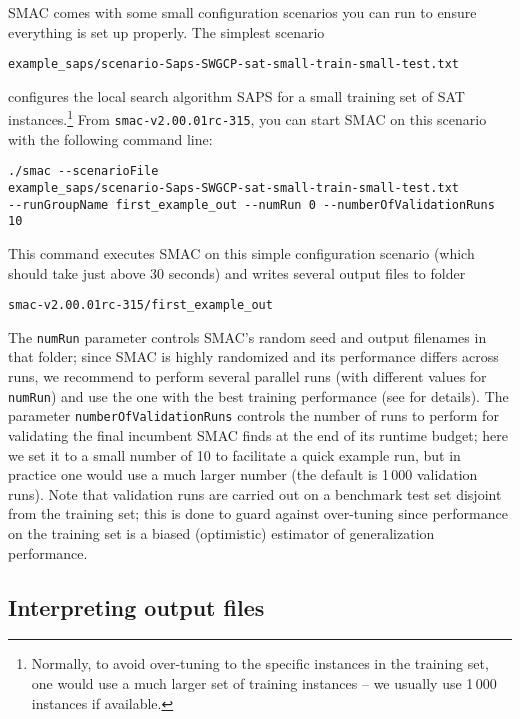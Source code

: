 \documentclass[11pt,letterpaper,twoside]{article}
\begin{document}
SMAC comes with some small configuration scenarios you can run to ensure everything is set up properly.
The simplest scenario
{\small
\begin{verbatim}
example_saps/scenario-Saps-SWGCP-sat-small-train-small-test.txt
\end{verbatim}
}
configures the local search algorithm SAPS for a small training set of SAT instances.\footnote{Normally, to avoid over-tuning to the specific instances in the training set, one would use a much larger set of training instances -- we usually use 1\,000 instances if available.} From \texttt{smac-v2.00.01rc-315}, you can start SMAC on this scenario with the following command line:
{\small
\begin{verbatim}
./smac --scenarioFile 
example_saps/scenario-Saps-SWGCP-sat-small-train-small-test.txt
--runGroupName first_example_out --numRun 0 --numberOfValidationRuns 10
\end{verbatim}
}
This command executes SMAC on this simple configuration scenario (which should take just above 30 seconds) and writes several output files to folder
{\small
\begin{verbatim}
smac-v2.00.01rc-315/first_example_out
\end{verbatim}
}
The \texttt{numRun} parameter controls SMAC's random seed and output filenames in that folder; since SMAC is highly randomized and its performance differs across runs, we recommend to perform several parallel runs (with different values for \texttt{numRun}) and use the one with the best training performance (see \cite{HutHooLey12-ParallelAC} for details).
The parameter \texttt{numberOfValidationRuns} controls the number of runs to perform for validating the final incumbent SMAC finds at the end of its runtime budget; here we set it to a small number of 10 to facilitate a quick example run, but in practice one would use a much larger number (the default is 1\,000 validation runs). Note that validation runs are carried out on a benchmark test set disjoint from the training set; this is done to guard against over-tuning since performance on the training set is a biased (optimistic) estimator of generalization performance.

\subsection{Interpreting output files}
\end{document}
